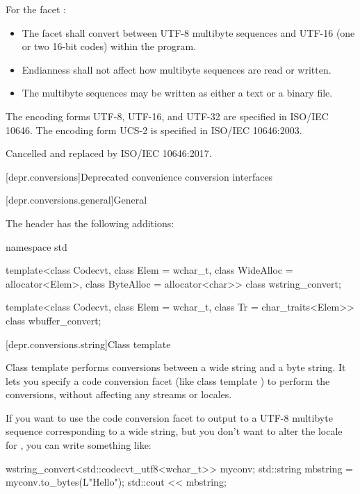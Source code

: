 \pnum
For the facet :
\begin{itemize}
\item
  The facet shall convert between UTF-8 multibyte sequences
  and UTF-16 (one or two 16-bit codes) within the program.
\item
  Endianness shall not affect how multibyte sequences are read or written.
\item
  The multibyte sequences may be written as either a text or a binary file.
\end{itemize}

\pnum
The encoding forms UTF-8, UTF-16, and UTF-32 are specified in ISO/IEC 10646.
The encoding form UCS-2 is specified in ISO/IEC 10646:2003.
\begin{footnote}
Cancelled and replaced by ISO/IEC 10646:2017.
\end{footnote}

[depr.conversions]{Deprecated convenience conversion interfaces}

[depr.conversions.general]{General}

\pnum
The header  has the following additions:
\begin{codeblock}
namespace std {
  template<class Codecvt, class Elem = wchar_t,
           class WideAlloc = allocator<Elem>,
           class ByteAlloc = allocator<char>>
    class wstring_convert;

  template<class Codecvt, class Elem = wchar_t,
           class Tr = char_traits<Elem>>
    class wbuffer_convert;
}
\end{codeblock}

[depr.conversions.string]{Class template }

\pnum
Class template  performs conversions between a wide
string and a byte string. It lets you specify a code conversion facet
(like class template ) to perform the conversions, without
affecting any streams or locales.
\begin{example}
If you want to use the code
conversion facet  to output to  a UTF-8
multibyte sequence corresponding to a wide string, but you don't want to
alter the locale for , you can write something like:
\begin{codeblock}
wstring_convert<std::codecvt_utf8<wchar_t>> myconv;
std::string mbstring = myconv.to_bytes(L"Hello\n");
std::cout << mbstring;
\end{codeblock}
\end{example}

